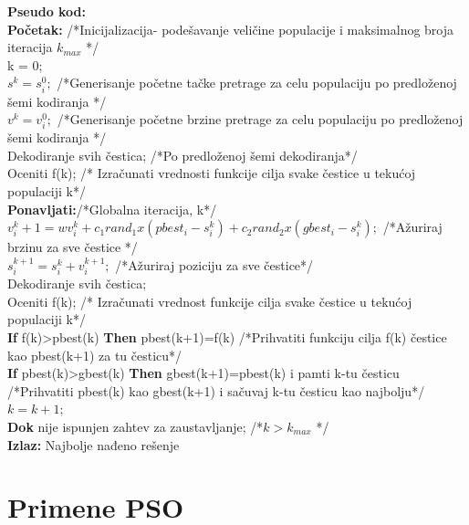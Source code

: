 \documentclass[a4paper]{article}
\begin{document}
\textbf{Pseudo kod:} \\ 
\textbf{Početak:} /*Inicijalizacija- podešavanje veličine populacije i maksimalnog broja iteracija $k_{max}$ */ \\
k = 0; \\
$s^k = s_{i}^0;$  /*Generisanje početne tačke pretrage za celu populaciju po predloženoj šemi kodiranja */ \\
$v^k = v_{i}^0;$  /*Generisanje početne brzine pretrage za celu populaciju po predloženoj šemi kodiranja */ \\
Dekodiranje svih čestica; /*Po predloženoj šemi dekodiranja*/ \\
Oceniti f(k); /* Izračunati vrednosti funkcije cilja svake čestice u tekućoj populaciji k*/ \\
\textbf{Ponavljati:}/*Globalna iteracija, k*/ \\
$v_{i}^k+1 = wv_{i}^k + c_{1}rand_{1} x (pbest_{i} - s_{i}^k) + c_{2}rand_{2} x (gbest_{i} - s_{i}^k);$ /*Ažuriraj brzinu za sve čestice */ \\
$s_{i}^{k+1} = s_{i}^k + v_{i}^{k+1};$ /*Ažuriraj poziciju za sve čestice*/ \\
Dekodiranje svih čestica; \\
Oceniti f(k); /* Izračunati vrednost funkcije cilja svake čestice u tekućoj populaciji k*/ \\
\textbf{If} f(k)>pbest(k) \textbf{Then} pbest(k+1)=f(k) /*Prihvatiti funkciju cilja f(k) čestice kao pbest(k+1) za tu česticu*/ \\
\textbf{If} pbest(k)>gbest(k) \textbf{Then} gbest(k+1)=pbest(k) i pamti k-tu česticu  /*Prihvatiti pbest(k) kao gbest(k+1) i sačuvaj k-tu česticu kao najbolju*/ \\
$k = k+1;$ \\
\textbf{Dok} nije ispunjen zahtev za zaustavljanje; /*$k > k_{max}$  */ \\
\textbf{Izlaz:} Najbolje nađeno rešenje \\


\section{Primene PSO}
\end{document}
